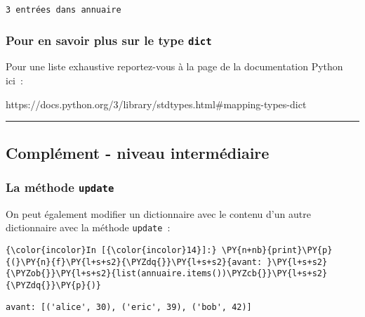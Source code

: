    \begin{Verbatim}[commandchars=\\\{\},frame=single,framerule=0.3mm,rulecolor=\color{cellframecolor}]
3 entrées dans annuaire
\end{Verbatim}

    \hypertarget{pour-en-savoir-plus-sur-le-type-dict}{%
\subsubsection{\texorpdfstring{Pour en savoir plus sur le type
\texttt{dict}}{Pour en savoir plus sur le type dict}}\label{pour-en-savoir-plus-sur-le-type-dict}}

    Pour une liste exhaustive reportez-vous à la page de la documentation
Python ici~:

https://docs.python.org/3/library/stdtypes.html\#mapping-types-dict

    \begin{center}\rule{0.5\linewidth}{\linethickness}\end{center}

    \hypertarget{compluxe9ment---niveau-intermuxe9diaire}{%
\subsection{Complément - niveau
intermédiaire}\label{compluxe9ment---niveau-intermuxe9diaire}}

    \hypertarget{la-muxe9thode-update}{%
\subsubsection{\texorpdfstring{La méthode
\texttt{update}}{La méthode update}}\label{la-muxe9thode-update}}

    On peut également modifier un dictionnaire avec le contenu d'un autre
dictionnaire avec la méthode \texttt{update}~:

    \begin{Verbatim}[commandchars=\\\{\},frame=single,framerule=0.3mm,rulecolor=\color{cellframecolor}]
{\color{incolor}In [{\color{incolor}14}]:} \PY{n+nb}{print}\PY{p}{(}\PY{n}{f}\PY{l+s+s2}{\PYZdq{}}\PY{l+s+s2}{avant: }\PY{l+s+s2}{\PYZob{}}\PY{l+s+s2}{list(annuaire.items())\PYZcb{}}\PY{l+s+s2}{\PYZdq{}}\PY{p}{)}
\end{Verbatim}


    \begin{Verbatim}[commandchars=\\\{\},frame=single,framerule=0.3mm,rulecolor=\color{cellframecolor}]
avant: [('alice', 30), ('eric', 39), ('bob', 42)]
\end{Verbatim}

